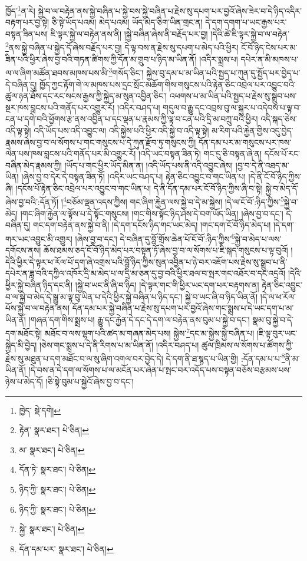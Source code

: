 ཁྱོད་\footnote{ཁྱེད་  སྡེ་དགེ། }ན་རེ། སྐྱེ་བ་ལ་བརྟེན་ནས་སྐྱེ་བཞིན་པ་སྐྱེ་བས་སྐྱེ་བཞིན་པ་རྗེས་སུ་དཔག་པར་བྱའོ་ཞེས་ཟེར་བ་དེ་ཉིད་འདིར་བརྟག་པར་བྱ་སྟེ། ཅི་སྟེ་ཡོད་པའམ། མེད་པའམ། ཡོད་མེད་ཅིག་ཡིན་གྲང་ན། དེ་དག་དགག་པ་ཡང་རྒྱས་པར་བསྟན་ཟིན་པས། ཇི་ལྟར་སྐྱེ་ལ་བརྟེན་ནས་ནི། །སྐྱེ་བཞིན་ཞེས་ནི་བརྗོད་པར་བྱ། །དེའི་ཚེ་ཇི་ལྟར་སྐྱེ་བ་ལ་བརྟེན་\footnote{རྟེན་  སྣར་ཐང་།  པེ་ཅིན། }ནས་སྐྱེ་བཞིན་པ་སྐྱེད་དོ་ཞེས་བརྗོད་པར་བྱ། དེ་ལྟ་བས་ན་རྗེས་སུ་དཔག་པ་མེད་པའི་ཕྱིར། ངོ་བོ་ཉིད་ངེས་པར་མ་ཟིན་པའི་ཕྱིར་ཞེས་བྱ་བའི་གཏན་ཚིགས་ཀྱི་དོན་མ་གྲུབ་པ་ཉིད་མ་ཡིན་ནོ། །འདིར་སྨྲས་པ། དཔེར་ན་མི་མཁས་པ་ལ་ལ་ཞིག་མཚོན་ཐབས་མཁས་པས་མི་\footnote{མ་  སྣར་ཐང་།  པེ་ཅིན། }གསོད་ཅིང་། སྐྱེས་བུ་དམ་པ་མ་ཡིན་པའི་སྤྱད་པ་ཀུན་དུ་སྤྱོད་པར་བྱེད་པ་དེ་བཞིན་དུ། ཁྱོད་ཀྱང་རྟོག་གེ་ལ་མཁས་པས་དྲང་སྲོང་མཆོག་གིས་གསུངས་པའི་རྟེན་ཅིང་འབྲེལ་པར་འབྱུང་བའི་ཚུལ་ཉན་ཐོས་དང་རང་སངས་རྒྱས་ཀྱི་སྐྱེད་མ་སུན་འབྱིན་ཅིང་། འཕགས་པ་མ་ཡིན་པའི་སྤྱད་པ་རྗེས་སུ་སྒྲུབ་པས་སྔར་ཁས་བླངས་པའི་གནོད་པར་འགྱུར་རོ། །འདིར་བཤད་པ། གདུལ་བ་རྒྱུ་དང་འབྲས་བུ་ལ་སྐུར་པ་འདེབས་པ་ལྟ་བ་ངན་པ་དགེ་བའི་ཕྱོགས་རྩ་ནས་འབྱིན་པ་དང་ལྡན་པ་རྣམས་ཀྱི་ལྟ་བ་ངན་པའི་དྲི་མ་བཀྲུ་བའི་ཕྱིར། འདི་སྐད་ཅེས་འདི་ལྟ་སྟེ། འདི་ཡོད་པས་འདི་འབྱུང་ལ། འདི་སྐྱེས་པའི་ཕྱིར་འདི་སྐྱེ་བ་འདི་ལྟ་སྟེ། མ་རིག་པའི་རྐྱེན་གྱིས་འདུ་བྱེད་རྣམས་ཞེས་བྱ་བ་ལ་སོགས་པ་གང་གསུངས་པ་དེ་ཀུན་རྫོབ་ཏུ་གསུངས་ཀྱི། དོན་དམ་པར་མ་གསུངས་པར་ཁས་ལེན་པས་ཁས་བླངས་པའི་གནོད་པར་མི་འགྱུར་རོ། །འདི་ཡང་བསྟན་ཟིན་ཏེ། གང་དུ་ཅི་བསྟན་ཞེ་ན། དངོས་པོ་རང་བཞིན་མེད་རྣམས་ཀྱི། །ཡོད་པ་གང་ཕྱིར་ཡོད་མིན་ན། །འདི་ཡོད་པས་ནི་འདི་འབྱུང་ཞེས། །བྱ་བ་དེ་ནི་འཐད་མ་ཡིན། །ཞེས་བྱ་བ་དེར་དེ་བསྟན་ཟིན་ཏོ། །འདིར་ཡང་བཤད་པ། རྟེན་ཅིང་འབྱུང་བ་གང་ཡིན་པ། །དེ་ནི་ངོ་བོ་ཉིད་ཀྱིས་ཞི། །དངོས་པོ་རྟེན་ཅིང་འབྲེལ་པར་འབྱུང་བ་གང་ཡིན་པ། དེ་ནི་དོན་དམ་པར་ངོ་བོ་ཉིད་ཀྱིས་ཞི་བ་སྟེ། སྐྱེ་བ་མེད་དོ་ཞེས་བྱ་བའི་:དོན་ཏོ། །\footnote{དོན་ཏེ་  སྣར་ཐང་།  པེ་ཅིན། }བཅོམ་ལྡན་འདས་ཀྱིས། གང་ཞིག་རྐྱེན་ལས་སྐྱེ་བ་དེ་མ་སྐྱེས། །དེ་ལ་ངོ་བོ་:ཉིད་ཀྱིས་\footnote{ཉིད་ཀྱི་  སྣར་ཐང་།  པེ་ཅིན། }སྐྱེ་བ་མེད། །གང་ཞིག་རྐྱེན་ལ་ལྟོས་པ་དེ་སྟོང་གསུངས། །གང་གིས་སྟོང་ཉིད་ཤེས་དེ་བག་ཡོད་ཡིན། །ཞེས་བྱ་བ་དང་། དེ་བཞིན་དུ། གང་དག་བརྟེན་ནས་སྐྱེ་བ་ནི། །དེ་དག་དངོས་ཉིད་གང་ཡང་མེད། །གང་དག་ངོ་བོ་ཉིད་མེད་པ། །དེ་དག་གར་ཡང་འབྱུང་མི་འགྱུར། །ཞེས་བྱ་བ་དང་། དེ་བཞིན་དུ་བློ་གྲོས་ཆེན་པོ་ངོ་བོ་:ཉིད་ཀྱིས་\footnote{ཉིད་ཀྱི་  སྣར་ཐང་།  པེ་ཅིན། }སྐྱེ་བ་མེད་པ་ལས་དགོངས་ནས། ཆོས་ཐམས་ཅད་ངོ་བོ་ཉིད་མེད་པར་བསྟན་ཏོ་ཞེས་བྱ་བ་ལ་སོགས་པ་ཇི་སྐད་གསུངས་པ་ལྟ་བུའོ། །དེའི་ཕྱིར་དེ་ལྟར་ཕ་རོལ་པོ་དག་ཞེ་འགྲས་པའི་བློ་ཉིད་ཀྱིས་སུན་འབྱིན་པ་ཉེ་བར་འཇོག་པས་རྗེས་སུ་སྒྲུབ་པ་ནི་དཔེར་ན་ཟླ་བའི་དཀྱིལ་འཁོར་དྲི་མ་མེད་པ་ལ་དྲི་མ་ཅན་དུ་བྱ་བའི་ཕྱིར་ཐལ་བ་སྤར་གང་འཐོར་བ་དང་འདྲའོ། །དེའི་ཕྱིར་སྐྱེ་བཞིན་ཉིད་དང་ནི། །སྐྱེ་བ་ཡང་ནི་ཞི་བ་ཉིད། །དེ་ལྟར་གང་གི་ཕྱིར་ཡང་དག་པར་བརྟགས་ན། རྟེན་ཅིང་འབྱུང་བ་ལ་སྐྱེ་བ་མེད་དེ་སྒྱུ་མ་ལྟ་བུ་ཡིན་པ་དེའི་ཕྱིར་སྐྱེ་བཞིན་པ་ཉིད་དང་། སྐྱེ་བ་ཡང་ཞི་བ་ཉིད་ཡིན་ནོ། །དེ་ལ་ཕ་རོལ་པོས་སྐྱེ་བ་ལ་བརྟེན་ནས། དོན་དམ་པར་སྐྱེ་བཞིན་པ་རྗེས་སུ་དཔག་པར་བྱའོ་ཞེས་གང་སྨྲས་པ་དེ་ཡང་དག་པ་མ་ཡིན་ནོ། །གཞན་དག་གིས་སྨྲས་པ། རྒྱུ་དང་རྐྱེན་དེ་དང་དེ་དག་ལ་བརྟེན་ནས་བུམ་པ་སྐྱེ་བ་དང་། སྣམ་བུ་སྐྱེ་བ་དེ་དག་མཐོང་སྟེ། མཐོང་བ་ལས་ལྷག་པའི་ཚད་མ་གཞན་མེད་པས། སྐྱེས་\footnote{སྐྱེ་  སྣར་ཐང་།  པེ་ཅིན། }དང་མ་སྐྱེས་སྐྱེ་བཞིན་པ། །ཇི་ལྟ་བུར་ཡང་སྐྱེད་མི་བྱེད། །ཅེས་གང་སྨྲས་པ་དེ་ནི་རིགས་པ་མ་ཡིན་ནོ། །འདིར་བཤད་པ། ཚུལ་ཁྲིམས་ལ་སོགས་པ་ཚོགས་ཀྱི་རྗེས་སུ་མཐུན་པ་དག་མཐོང་བ་ལ་སུ་ཞིག་འགལ་བར་བྱེད་དེ། དེ་དག་ནི་ཐ་སྙད་པ་ཡིན་གྱི། :དོན་དམ་པ་པ་\footnote{དོན་དམ་པར་  སྣར་ཐང་།  པེ་ཅིན། }ནི་མ་ཡིན་ནོ། །དེ་བས་ན་དེ་དག་ལ་སོགས་པ་ལ་མངོན་པར་ཞེན་པ་སྤང་བར་འདོད་པས་བསྟན་བཅོས་བརྩམས་པས་ཉེས་པ་མེད་དོ། །ཅི་སྟེ་བུམ་པ་སྐྱེའོ་ཞེས་བྱ་བ་དང་། 